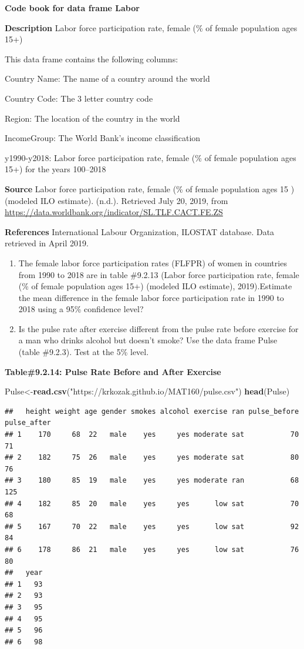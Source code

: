 \documentclass[
]{book}
\newenvironment{Shaded}{\begin{snugshade}}{\end{snugshade}}
\newcommand{\KeywordTok}[1]{\textcolor[rgb]{0.13,0.29,0.53}{\textbf{#1}}}
\newcommand{\NormalTok}[1]{#1}
\newcommand{\StringTok}[1]{\textcolor[rgb]{0.31,0.60,0.02}{#1}}
\begin{document}
\textbf{Code book for data frame Labor}

\textbf{Description}
Labor force participation rate, female (\% of female population ages 15+)

This data frame contains the following columns:

Country Name: The name of a country around the world

Country Code: The 3 letter country code

Region: The location of the country in the world

IncomeGroup: The World Bank's income classification

y1990-y2018: Labor force participation rate, female (\% of female population ages 15+) for the years 100--2018

\textbf{Source}
Labor force participation rate, female (\% of female population ages 15 ) (modeled ILO estimate). (n.d.). Retrieved July 20, 2019, from \url{https://data.worldbank.org/indicator/SL.TLF.CACT.FE.ZS}

\textbf{References}
International Labour Organization, ILOSTAT database. Data retrieved in April 2019.

\begin{enumerate}
\def\labelenumi{\arabic{enumi}.}
\setcounter{enumi}{9}
\item
  The female labor force participation rates (FLFPR) of women in countries from 1990 to 2018 are in table \#9.2.13 (Labor force participation rate, female (\% of female population ages 15+) (modeled ILO estimate), 2019).Estimate the mean difference in the female labor force participation rate in 1990 to 2018 using a 95\% confidence level?
\item
  Is the pulse rate after exercise different from the pulse rate before exercise for a man who drinks alcohol but doesn't smoke? Use the data frame Pulse (table \#9.2.3). Test at the 5\% level.
\end{enumerate}

\textbf{Table\#9.2.14: Pulse Rate Before and After Exercise}

\begin{Shaded}
\begin{Highlighting}[]
\NormalTok{Pulse<-}\KeywordTok{read.csv}\NormalTok{(}\StringTok{"https://krkozak.github.io/MAT160/pulse.csv"}\NormalTok{)}
\KeywordTok{head}\NormalTok{(Pulse)}
\end{Highlighting}
\end{Shaded}

\begin{verbatim}
##   height weight age gender smokes alcohol exercise ran pulse_before pulse_after
## 1    170     68  22   male    yes     yes moderate sat           70          71
## 2    182     75  26   male    yes     yes moderate sat           80          76
## 3    180     85  19   male    yes     yes moderate ran           68         125
## 4    182     85  20   male    yes     yes      low sat           70          68
## 5    167     70  22   male    yes     yes      low sat           92          84
## 6    178     86  21   male    yes     yes      low sat           76          80
##   year
## 1   93
## 2   93
## 3   95
## 4   95
## 5   96
## 6   98
\end{verbatim}
\end{document}
